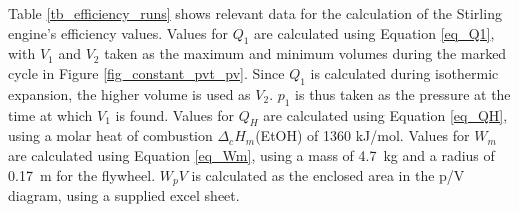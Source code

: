 \documentclass[titlepage]{article}
\begin{document}
\noindent Table \ref{tb_efficiency_runs} shows relevant data for the calculation of the Stirling engine's efficiency values. Values for \(Q_1\) are calculated using Equation \ref{eq_Q1}, with \(V_1\) and \(V_2\) taken as the maximum and minimum volumes during the marked cycle in Figure \ref{fig_constant_pvt_pv}. Since \(Q_1\) is calculated during isothermic expansion, the higher volume is used as \(V_2\). \(p_1\) is thus taken as the pressure at the time at which \(V_1\) is found. Values for \(Q_H\) are calculated using Equation \ref{eq_QH}, using a molar heat of combustion \(\Delta_c H_m\)(EtOH) of 1360 kJ/mol. Values for \(W_m\) are calculated using Equation \ref{eq_Wm}, using a mass of 4.7~kg and a radius of 0.17~m for the flywheel. \(W_pV\) is calculated as the enclosed area in the p/V diagram, using a supplied excel sheet.
\end{document}
